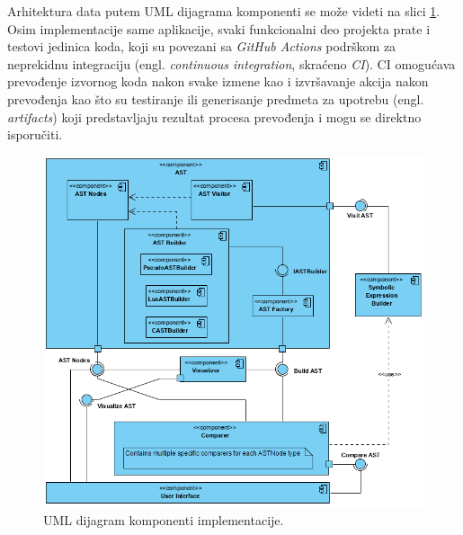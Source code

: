 Arhitektura data putem UML dijagrama komponenti se može videti na slici \ref{fig:ImplementationComponents}. Osim implementacije same aplikacije, svaki funkcionalni deo projekta prate i testovi jedinica koda, koji su povezani sa \emph{GitHub Actions} podrškom za neprekidnu integraciju (engl. \emph{continuous integration}, skraćeno \emph{CI}). CI omogućava prevođenje izvornog koda nakon svake izmene kao i izvršavanje akcija nakon prevođenja kao što su testiranje ili generisanje predmeta za upotrebu (engl. \emph{artifacts}) koji predstavljaju rezultat procesa prevođenja i mogu se direktno isporučiti.

\begin{figure}[h!]
\centering
\includegraphics[scale=0.8]{images/uml/ComponentDiagram.png}
\caption{UML dijagram komponenti implementacije.}
\label{fig:ImplementationComponents}
\end{figure}









